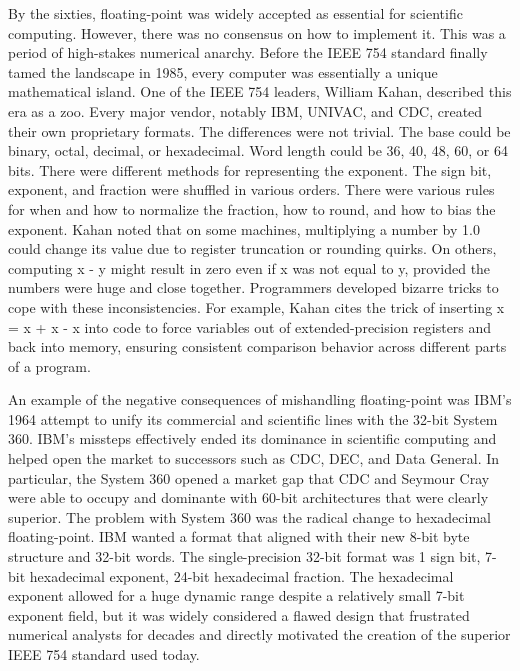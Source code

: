 By the sixties, floating-point was widely accepted as essential for scientific computing. However, there was no consensus on how to implement it. This was a period of high-stakes numerical anarchy. Before the IEEE 754 standard finally tamed the landscape in 1985, every computer was essentially a unique mathematical island. One of the IEEE 754 leaders, William Kahan, described this era as a zoo. Every major vendor, notably IBM, UNIVAC, and CDC, created their own proprietary formats. The differences were not trivial. The base could be binary, octal, decimal, or hexadecimal. Word length could be 36, 40, 48, 60, or 64 bits. There were different methods for representing the exponent. The sign bit, exponent, and fraction were shuffled in various orders. There were various rules for when and how to normalize the fraction, how to round, and how to bias the exponent. Kahan noted that on some machines, multiplying a number by 1.0 could change its value due to register truncation or rounding quirks. On others, computing x - y might result in zero even if x was not equal to y, provided the numbers were huge and close together. Programmers developed bizarre tricks to cope with these inconsistencies. For example, Kahan cites the trick of inserting x = x + x - x into code to force variables out of extended-precision registers and back into memory, ensuring consistent comparison behavior across different parts of a program. 

An example of the negative consequences of mishandling floating-point was IBM’s 1964 attempt to unify its commercial and scientific lines with the 32-bit System 360. IBM’s missteps effectively ended its dominance in scientific computing and helped open the market to successors such as CDC, DEC, and Data General. In particular, the System 360 opened a market gap that CDC and Seymour Cray were able to occupy and dominante with 60-bit architectures that were clearly superior. The problem with System 360 was the radical change to hexadecimal floating-point. IBM wanted a format that aligned with their new 8-bit byte structure and 32-bit words. The single-precision 32-bit format was 1 sign bit, 7-bit hexadecimal exponent, 24-bit hexadecimal fraction. The hexadecimal exponent allowed for a huge dynamic range despite a relatively small 7-bit exponent field, but it was widely considered a flawed design that frustrated numerical analysts for decades and directly motivated the creation of the superior IEEE 754 standard used today. 


